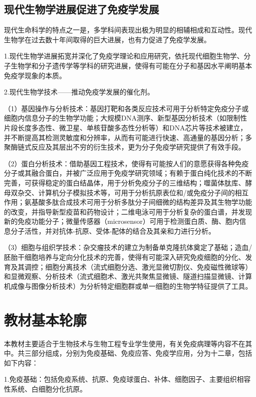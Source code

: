\subsection{现代生物学进展促进了免疫学发展}

现代生命科学的特点之一是，多学科间表现出极为明显的相辅相成和互动性。现代生物学在过去数十年间取得的巨大进展，也有力促进了免疫学发展。

1.现代生物学进展拓宽并深化了免疫学理论和应用研究，依托现代细胞生物学、分子生物学和分子遗传学等学科的研究进展，使得有可能在分子和基因水平阐明基本免疫学现象的本质。

2.现代生物学技术------推动免疫学发展的催化剂。

（1）基因操作与分析技术：基因打靶和各类反应技术可用于分析特定免疫分子或细胞内信息分子的生物学功能；大规模DNA测序、新型基因分析技术（如限制性片段长度多态性、微卫星、单核苷酸多态性分析等）和DNA芯片等技术被建立，并不断提高其检测灵敏度和分辨率，从而有可能进行快速、高通量的基因分析；多聚酶链式反应及其层出不穷的衍生技术，更为分子免疫学研究提供了有效手段。

（2）蛋白分析技术：借助基因工程技术，使得有可能按人们的意愿获得各种免疫分子或其融合蛋白，并被广泛应用于免疫学研究领域；有赖于蛋白纯化技术的不断完善，可获得稳定的蛋白结晶体，用于分析免疫分子的三维结构；噬菌体肽库、酵母双杂交、计算机分子模拟技术等，可用于分析抗原表位和/或免疫分子间的相互作用；氨基酸多肽合成技术可用于分析多肽分子间细微的结构差异及其生物学功能的改变，并指导新型疫苗和药物设计；二维电泳可用于分析复杂的蛋白谱，并发现新的免疫功能分子；微量传感器（microsensor）可用于检测蛋白质、酶、胞内信息分子活性，并对抗体-抗原、受体-配体的结合及其亲和力进行分析。

（3）细胞与组织学技术：杂交瘤技术的建立为制备单克隆抗体奠定了基础；造血/胚胎干细胞培养与定向分化技术的完善，使得有可能深入研究免疫细胞的分化、发育及其调控；细胞分离技术（流式细胞分选、激光显微切割仪、免疫磁性微球等）和显微观察、分析技术（流式细胞术、激光共聚焦显微镜、隧道扫描显微镜、计算机成像与图像分析技术）为分析特定细胞群或单一细胞的生物学特征提供了工具。

\section{教材基本轮廓}

本教材主要适合于生物技术与生物工程专业学生使用，有关免疫病理等内容不在其中。共三部分组成，分别为免疫基础、免疫应答、免疫学应用，分为十二章，包括如下内容：

1.免疫基础：包括免疫系统、抗原、免疫球蛋白、补体、细胞因子、主要组织相容性系统、白细胞分化抗原。

